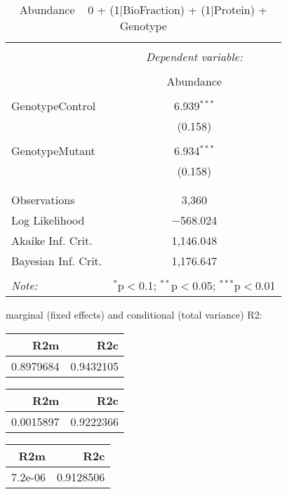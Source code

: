 \documentclass[11pt]{report}
\begin{document}
\begin{table}[!htbp] \centering 
  \caption{Abundance ~ 0 + (1|BioFraction) + (1|Protein) + Genotype} 
  \label{} 
\begin{tabular}{@{\extracolsep{5pt}}lc} 
\\[-1.8ex]\hline 
\hline \\[-1.8ex] 
 & \multicolumn{1}{c}{\textit{Dependent variable:}} \\ 
\cline{2-2} 
\\[-1.8ex] & Abundance \\ 
\hline \\[-1.8ex] 
 GenotypeControl & 6.939$^{***}$ \\ 
  & (0.158) \\ 
  & \\ 
 GenotypeMutant & 6.934$^{***}$ \\ 
  & (0.158) \\ 
  & \\ 
\hline \\[-1.8ex] 
Observations & 3,360 \\ 
Log Likelihood & $-$568.024 \\ 
Akaike Inf. Crit. & 1,146.048 \\ 
Bayesian Inf. Crit. & 1,176.647 \\ 
\hline 
\hline \\[-1.8ex] 
\textit{Note:}  & \multicolumn{1}{r}{$^{*}$p$<$0.1; $^{**}$p$<$0.05; $^{***}$p$<$0.01} \\ 
\end{tabular} 
\end{table} 
marginal (fixed effects) and conditional (total variance) R2:

\begin{tabular}{r|r}
\hline
R2m & R2c\\
\hline
0.8979684 & 0.9432105\\
\hline
\end{tabular}

\begin{tabular}{r|r}
\hline
R2m & R2c\\
\hline
0.0015897 & 0.9222366\\
\hline
\end{tabular}

\begin{tabular}{r|r}
\hline
R2m & R2c\\
\hline
7.2e-06 & 0.9128506\\
\hline
\end{tabular}
\end{document}
